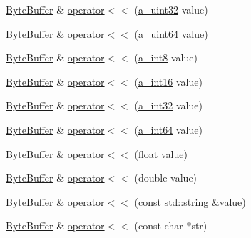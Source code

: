 \begin{DoxyCompactItemize}
\item 
\hyperlink{class_agmd_network_1_1_byte_buffer}{Byte\+Buffer} \& \hyperlink{class_agmd_network_1_1_byte_buffer_ae5cd9a97be8586ca64d3a8976905aedd}{operator$<$$<$} (\hyperlink{_common_defines_8h_a964296f9770051b9e4807b1f180dd416}{a\+\_\+uint32} value)
\item 
\hyperlink{class_agmd_network_1_1_byte_buffer}{Byte\+Buffer} \& \hyperlink{class_agmd_network_1_1_byte_buffer_a125772d3592dffdce850d02b52d95c15}{operator$<$$<$} (\hyperlink{_common_defines_8h_a6c5192ec3c55d6e5b13d2dbaa082bdea}{a\+\_\+uint64} value)
\item 
\hyperlink{class_agmd_network_1_1_byte_buffer}{Byte\+Buffer} \& \hyperlink{class_agmd_network_1_1_byte_buffer_a9b4fb66a85980e3e5ae522c8ef47021d}{operator$<$$<$} (\hyperlink{_common_defines_8h_a29a7f712ca0e13d1cc6485d440fd7ca5}{a\+\_\+int8} value)
\item 
\hyperlink{class_agmd_network_1_1_byte_buffer}{Byte\+Buffer} \& \hyperlink{class_agmd_network_1_1_byte_buffer_a1ac60a2bcb5a7dd64451fee162b7821f}{operator$<$$<$} (\hyperlink{_common_defines_8h_a6e749f7b48811016d7aa0f0046b2d849}{a\+\_\+int16} value)
\item 
\hyperlink{class_agmd_network_1_1_byte_buffer}{Byte\+Buffer} \& \hyperlink{class_agmd_network_1_1_byte_buffer_a8135db569d252e48c28621b321282bdb}{operator$<$$<$} (\hyperlink{_common_defines_8h_ae2e4316e0b924774484a728669bebc9b}{a\+\_\+int32} value)
\item 
\hyperlink{class_agmd_network_1_1_byte_buffer}{Byte\+Buffer} \& \hyperlink{class_agmd_network_1_1_byte_buffer_a1283e00a625e2ecde7ac15cfd45d4c4e}{operator$<$$<$} (\hyperlink{_common_defines_8h_aef7f6b0e5e05482b56bd478f250ba0a9}{a\+\_\+int64} value)
\item 
\hyperlink{class_agmd_network_1_1_byte_buffer}{Byte\+Buffer} \& \hyperlink{class_agmd_network_1_1_byte_buffer_a6361b9b18f28495de6803846bd0c9db1}{operator$<$$<$} (float value)
\item 
\hyperlink{class_agmd_network_1_1_byte_buffer}{Byte\+Buffer} \& \hyperlink{class_agmd_network_1_1_byte_buffer_ad81f0e8f77aed84ddaaf4a22b88c76a0}{operator$<$$<$} (double value)
\item 
\hyperlink{class_agmd_network_1_1_byte_buffer}{Byte\+Buffer} \& \hyperlink{class_agmd_network_1_1_byte_buffer_a86a02a642d6850baf5acf48940ec5264}{operator$<$$<$} (const std\+::string \&value)
\item 
\hyperlink{class_agmd_network_1_1_byte_buffer}{Byte\+Buffer} \& \hyperlink{class_agmd_network_1_1_byte_buffer_a0fb671a735307fd1b32f6473f81505fc}{operator$<$$<$} (const char $\ast$str)

\end{DoxyCompactItemize}
